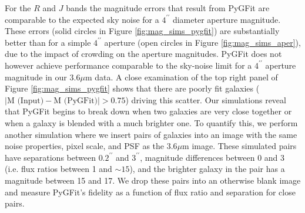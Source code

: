 \documentclass[preprint]{aastex}
\newcommand{\pygfit}{PyGFit}
\begin{document}
For the $R$ and $J$ bands the magnitude errors that result from \pygfit{} are comparable to the expected sky noise for a $4^{\prime\prime}$ diameter aperture magnitude. These errors (solid circles in Figure \ref{fig:mag_sims_pygfit}) are substantially better than
for a simple $4^{\prime\prime}$ aperture (open circles in Figure \ref{fig:mag_sims_aper}), due to the impact of crowding on the aperture magnitudes. 
%
\pygfit{} does not however achieve performance comparable to the sky-noise limit for a $4^{\prime\prime}$ aperture magnitude in our $3.6\mu$m data.  A close examination of the top right panel of Figure \ref{fig:mag_sims_pygfit} shows that there are poorly fit galaxies ($|\textrm{M (Input)} - \textrm{M (PyGFit)}| > 0.75$) driving this scatter.  Our simulations reveal that \pygfit{} begins to break down when two galaxies are very close together or when a galaxy is blended with a much brighter one.  To quantify this, we perform another simulation where we insert pairs of galaxies into an image with the same noise properties, pixel scale, and PSF as the $3.6\mu$m image.  These simulated pairs have separations between $0.2^{\prime\prime}$ and $3^{\prime\prime}$, magnitude differences between 0 and 3 (i.e. flux ratios between 1 and $\sim15$), and the brighter galaxy in the pair has a magnitude between 15 and 17.  We drop these pairs into an otherwise blank image and measure \pygfit{}'s fidelity as a function of flux ratio and separation for close pairs.
\end{document}
